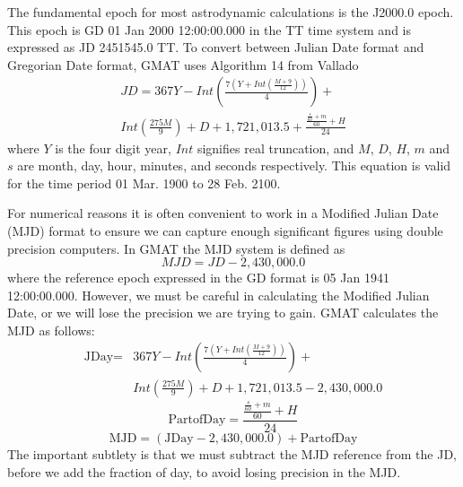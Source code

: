 The fundamental epoch for most astrodynamic calculations is the
J2000.0 epoch\cite{seidelmann}.  This epoch is GD 01 Jan 2000
12:00:00.000 in the TT time system and is expressed as JD 2451545.0
TT. To convert between Julian Date format and Gregorian Date format,
GMAT uses Algorithm 14 from Vallado\cite{vallado2}
%
\begin{equation}
\begin{split}
    JD = 367Y - Int\left( \displaystyle\frac{ 7\left( Y + Int\left( \displaystyle\frac{M + 9}{12} \right) \right)}{4}
    \right)+ \\Int\left(\displaystyle\frac{275M}{9} \right) + D +
    1,721,013.5 + \frac{ \displaystyle\frac{ \displaystyle\frac{s}{60}+m}{60} + H}{24}
    \end{split}
\end{equation}
%
where $Y$ is the four digit year, $Int$ signifies real truncation,
and $M$, $D$, $H$, $m$ and $s$ are month, day, hour, minutes, and
seconds respectively. This equation is valid for the time period 01
Mar. 1900 to 28 Feb. 2100.

For numerical reasons it is often convenient to work in a Modified
Julian Date (MJD) format to ensure we can capture enough significant
figures using double precision computers.  In GMAT the MJD system is
defined as
%
\begin{equation}
     MJD = JD - 2,430,000.0
\end{equation}
%
where the reference epoch expressed in the GD format is 05 Jan 1941
12:00:00.000.  However, we must be careful in calculating the
Modified Julian Date, or we will lose the precision we are trying to
gain.  GMAT calculates the MJD as follows:
%
\begin{equation}
     \begin{split}
     \mbox{JDay} = & 367Y - Int\left( \displaystyle\frac{ 7\left( Y + Int\left( \displaystyle\frac{M + 9}{12} \right) \right)}{4}
    \right)+ \\ & Int\left(\displaystyle\frac{275M}{9} \right) + D +
    1,721,013.5 - 2,430,000.0
    \end{split}
\end{equation}
%
\begin{equation}
     \mbox{PartofDay} = \frac{ \displaystyle\frac{ \displaystyle\frac{s}{60}+m}{60} + H}{24}
\end{equation}
%
\begin{equation}
     \mbox{MJD} = (\mbox{JDay}- 2,430,000.0) + \mbox{PartofDay}
\end{equation}
%
The important subtlety is that we must subtract the MJD reference
from the JD, before we add the fraction of day, to avoid losing
precision in the MJD.

